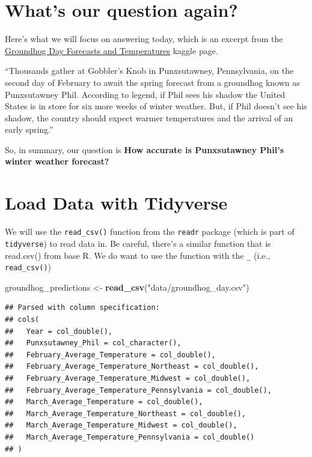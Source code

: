 \documentclass[
]{book}
\newenvironment{Shaded}{\begin{snugshade}}{\end{snugshade}}
\newcommand{\KeywordTok}[1]{\textcolor[rgb]{0.13,0.29,0.53}{\textbf{#1}}}
\newcommand{\NormalTok}[1]{#1}
\newcommand{\StringTok}[1]{\textcolor[rgb]{0.31,0.60,0.02}{#1}}
\begin{document}
\hypertarget{whats-our-question-again}{%
\section{What's our question again?}\label{whats-our-question-again}}

Here's what we will focus on answering today, which is an excerpt from the \href{https://www.kaggle.com/groundhogclub/groundhog-day}{Groundhog Day Forecasts and Temperatures} kaggle page.

``Thousands gather at Gobbler's Knob in Punxsutawney, Pennsylvania, on the second day of February to await the spring forecast from a groundhog known as Punxsutawney Phil. According to legend, if Phil sees his shadow the United States is in store for six more weeks of winter weather. But, if Phil doesn't see his shadow, the country should expect warmer temperatures and the arrival of an early spring.''

So, in summary, our question is \textbf{How accurate is Punxsutawney Phil's winter weather forecast?}

\hypertarget{load-data-with-tidyverse}{%
\section{Load Data with Tidyverse}\label{load-data-with-tidyverse}}

We will use the \texttt{read\_csv()} function from the \texttt{readr} package (which is part of \texttt{tidyverse}) to read data in. Be careful, there's a similar function that is read.csv() from base R. We do want to use the function with the \texttt{\_} (i.e., \texttt{read\_csv()})

\begin{Shaded}
\begin{Highlighting}[]
\NormalTok{groundhog_predictions <-}\StringTok{ }\KeywordTok{read_csv}\NormalTok{(}\StringTok{"data/groundhog_day.csv"}\NormalTok{)}
\end{Highlighting}
\end{Shaded}

\begin{verbatim}
## Parsed with column specification:
## cols(
##   Year = col_double(),
##   Punxsutawney_Phil = col_character(),
##   February_Average_Temperature = col_double(),
##   February_Average_Temperature_Northeast = col_double(),
##   February_Average_Temperature_Midwest = col_double(),
##   February_Average_Temperature_Pennsylvania = col_double(),
##   March_Average_Temperature = col_double(),
##   March_Average_Temperature_Northeast = col_double(),
##   March_Average_Temperature_Midwest = col_double(),
##   March_Average_Temperature_Pennsylvania = col_double()
## )
\end{verbatim}
\end{document}
